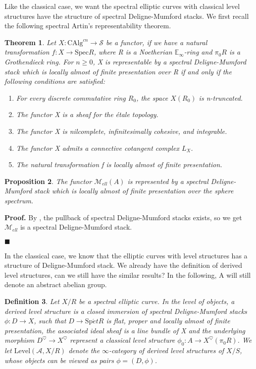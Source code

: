 \documentclass[12pt]{article}
\newtheorem{theorem}{Theorem}[section] %
\newtheorem{proposition}[theorem]{Proposition}
\theoremstyle{thry}
\newtheorem{definition}[theorem]{Definition}
\renewenvironment{proof}
{\par \noindent \textbf{Proof.}}
{ \par \hfill $\blacksquare$ \quad \par }
\def  \CAlg     {\mathrm{CAlg}}
\def  \Level    {\mathrm{Level}}
\def  \Spec     {\mathrm{Spec}}
\def  \Spet     {\mathrm{Sp}\acute{e}t}
\def  \ca       {\mathcal{A}}
\def  \cm       {\mathcal{M}}
\def  \cs       {\mathcal{S}}
\def  \be       {\mathbb{E}}
\begin{document}
Like the classical case, we want the spectral elliptic curves with classical level structures have the  structure of spectral Deligne-Mumford stacks. We first recall the following spectral Artin's representability theorem.
\begin{theorem} \cite[Theroem 18.3.0.1]{lu-SAG}
	Let $X: \CAlg^{cn} \to \cs$ be a functor, if we have a natural transformation $f: X \to \Spec R$, where R is a Noetherian $\be_{\infty}$-ring and $\pi_0 R$ is a Grothendieck ring. For $n \geq 0$, X is representable by a spectral Deligne-Mumford stack which is locally almost of finite presentation over R if and only if the following conditions are satisfied:
	\begin{enumerate}
		\item For every discrete commutative ring $R_0$, the space $X(R_0)$ is n-truncated.
		\item The functor X is a sheaf for the \'etale topology.
		\item The functor X is nilcomplete, infinitesimally cohesive, and integrable.
		\item The functor X admits a connective cotangent complex $L_X$.
		\item The natural transformation f is locally almost of finite presentation.
	\end{enumerate}	
\end{theorem}

\begin{proposition}
	The functor $\cm_{ell}(A)$ is represented by a spectral Deligne-Mumford stack which is locally almost of finite presentation over the sphere spectrum.
\end{proposition}
\begin{proof}
	By \cite[Proposition]{lu-SAG},  the pullback of spectral Deligne-Mumford stacks exists, so we get $\cm_{ell}$ is a spectral Deligne-Mumford stack. 
	
\end{proof}






\quad In the classical case, we know that the elliptic curves with level structures has a structure of Deligne-Mumford stack. We already have the definition of derived level structures, can we still have the similar results? In the following, A will  still denote an abstract abelian group. 



\begin{definition}
	Let $X/R$  be a  spectral  elliptic curve. In the level of objects, a derived level structure is a closed immersion of spectral Deligne-Mumford stacks $\phi: D \to X $, such that $D \to \Spet R$ is flat, proper and locally almost of finite presentation, the associated ideal sheaf is a line bundle of X  and the underlying  morphism $D^{\heartsuit} \to X^{\heartsuit}$ represent a classical level structure  $\phi_0: A \to X^{\heartsuit}(\pi_0 R)$.  We let $\Level(\ca, X/R)$ denote the $\infty$-category of derived level structures of $X/S$, whose objects can be viewed as pairs $ \phi=(D,\phi)$.
\end{definition}
\end{document}
